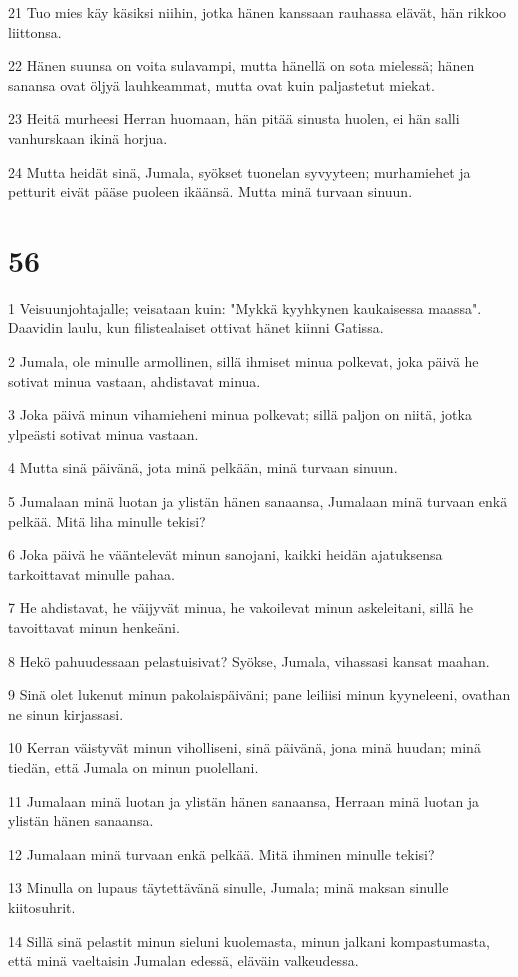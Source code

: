 \par 21 Tuo mies käy käsiksi niihin, jotka hänen kanssaan rauhassa elävät, hän rikkoo liittonsa.
\par 22 Hänen suunsa on voita sulavampi, mutta hänellä on sota mielessä; hänen sanansa ovat öljyä lauhkeammat, mutta ovat kuin paljastetut miekat.
\par 23 Heitä murheesi Herran huomaan, hän pitää sinusta huolen, ei hän salli vanhurskaan ikinä horjua.
\par 24 Mutta heidät sinä, Jumala, syökset tuonelan syvyyteen; murhamiehet ja petturit eivät pääse puoleen ikäänsä. Mutta minä turvaan sinuun.

\chapter{56}

\par 1 Veisuunjohtajalle; veisataan kuin: "Mykkä kyyhkynen kaukaisessa maassa". Daavidin laulu, kun filistealaiset ottivat hänet kiinni Gatissa.
\par 2 Jumala, ole minulle armollinen, sillä ihmiset minua polkevat, joka päivä he sotivat minua vastaan, ahdistavat minua.
\par 3 Joka päivä minun vihamieheni minua polkevat; sillä paljon on niitä, jotka ylpeästi sotivat minua vastaan.
\par 4 Mutta sinä päivänä, jota minä pelkään, minä turvaan sinuun.
\par 5 Jumalaan minä luotan ja ylistän hänen sanaansa, Jumalaan minä turvaan enkä pelkää. Mitä liha minulle tekisi?
\par 6 Joka päivä he vääntelevät minun sanojani, kaikki heidän ajatuksensa tarkoittavat minulle pahaa.
\par 7 He ahdistavat, he väijyvät minua, he vakoilevat minun askeleitani, sillä he tavoittavat minun henkeäni.
\par 8 Hekö pahuudessaan pelastuisivat? Syökse, Jumala, vihassasi kansat maahan.
\par 9 Sinä olet lukenut minun pakolaispäiväni; pane leiliisi minun kyyneleeni, ovathan ne sinun kirjassasi.
\par 10 Kerran väistyvät minun viholliseni, sinä päivänä, jona minä huudan; minä tiedän, että Jumala on minun puolellani.
\par 11 Jumalaan minä luotan ja ylistän hänen sanaansa, Herraan minä luotan ja ylistän hänen sanaansa.
\par 12 Jumalaan minä turvaan enkä pelkää. Mitä ihminen minulle tekisi?
\par 13 Minulla on lupaus täytettävänä sinulle, Jumala; minä maksan sinulle kiitosuhrit.
\par 14 Sillä sinä pelastit minun sieluni kuolemasta, minun jalkani kompastumasta, että minä vaeltaisin Jumalan edessä, eläväin valkeudessa.

